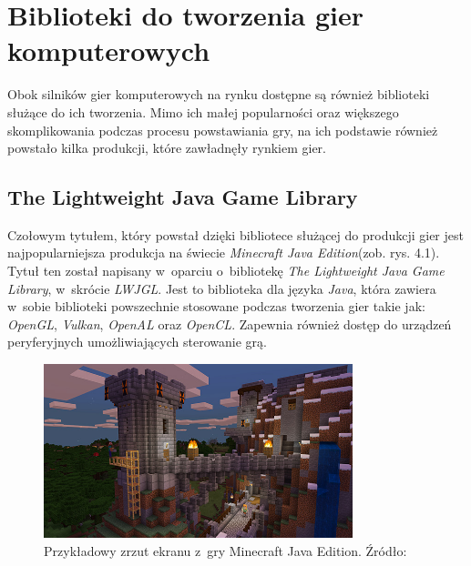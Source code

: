 \documentclass[12pt,a4paper,oneside]{book}
\theoremstyle{definition}
\numberwithin{equation}{chapter}
\begin{document}
\section{Biblioteki do tworzenia gier komputerowych}
\par Obok silników gier komputerowych na rynku dostępne są również biblioteki służące do ich tworzenia. Mimo ich małej popularności oraz większego skomplikowania podczas procesu powstawiania gry, na ich podstawie również powstało kilka produkcji, które zawładnęły rynkiem gier. 
\subsection{The Lightweight Java Game Library}
\par Czołowym tytułem, który powstał dzięki bibliotece służącej do produkcji gier jest najpopularniejsza produkcja na świecie \textit{Minecraft Java Edition}(zob. rys. 4.1). Tytuł ten został napisany w~oparciu o~bibliotekę \textit{The Lightweight Java Game Library}, w~skrócie \textit{LWJGL}. Jest to biblioteka dla języka \textit{Java}, która zawiera w~sobie biblioteki powszechnie stosowane podczas tworzenia gier takie jak: \textit{OpenGL}, \textit{Vulkan}, \textit{OpenAL} oraz \textit{OpenCL}. Zapewnia również dostęp do urządzeń peryferyjnych umożliwiających sterowanie grą.
\begin{figure}[hpt!]
        \centering
        \includegraphics[width=0.8\textwidth]{images/minecraft.jpg}
        \caption{Przykładowy zrzut ekranu z~gry Minecraft Java Edition. Źródło: \cite{Minecraft}}
        \label{Minecraft}
\end{figure}
\newpage
\end{document}
